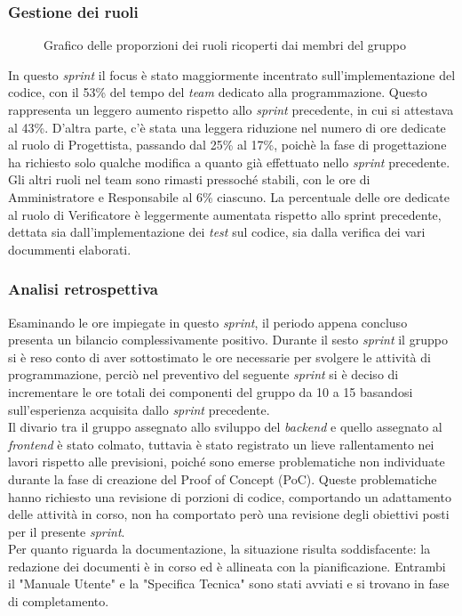 \subsubsection{Gestione dei ruoli}
\begin{figure}[h]
	\centering
	\caption{Grafico delle proporzioni dei ruoli ricoperti dai membri del gruppo}
\end{figure}

In questo \textit{sprint} il focus è stato maggiormente incentrato sull'implementazione del codice, con il 53\% del tempo del \textit{team} dedicato alla programmazione. Questo rappresenta un leggero aumento rispetto allo \textit{sprint} precedente, in cui si attestava al 43\%.
D'altra parte, c'è stata una leggera riduzione nel numero di ore dedicate al ruolo di Progettista, passando dal 25\% al 17\%, poichè la fase di progettazione ha richiesto solo qualche modifica a quanto già effettuato nello \textit{sprint} precedente.
Gli altri ruoli nel team sono rimasti pressoché stabili, con le ore di Amministratore e Responsabile al 6\% ciascuno. 
La percentuale delle ore dedicate al ruolo di Verificatore è leggermente aumentata rispetto allo sprint precedente, dettata sia dall'implementazione dei \textit{test} sul codice, sia dalla verifica dei vari docummenti elaborati.

\subsubsection{Analisi retrospettiva}
Esaminando le ore impiegate in questo \textit{sprint}, il periodo appena concluso presenta un bilancio complessivamente positivo. Durante il sesto \textit{sprint} il gruppo si è reso conto di aver sottostimato le ore necessarie per svolgere le attività di programmazione, perciò nel preventivo del seguente \textit{sprint} si è deciso di incrementare le ore totali dei componenti del gruppo da 10 a 15 basandosi sull'esperienza acquisita dallo \textit{sprint} precedente.\\
Il divario tra il gruppo assegnato allo sviluppo del \textit{backend} e quello assegnato al \textit{frontend} è stato colmato, tuttavia è stato registrato un lieve rallentamento nei lavori rispetto alle previsioni, poiché sono emerse problematiche non individuate durante la fase di creazione del Proof of Concept (PoC). Queste problematiche hanno richiesto una revisione di porzioni di codice, comportando un adattamento delle attività in corso, non ha comportato però una revisione degli obiettivi posti per il presente \textit{sprint}.\\
Per quanto riguarda la documentazione, la situazione risulta soddisfacente: la redazione dei documenti è in corso ed è allineata con la pianificazione. Entrambi il "Manuale Utente" e la "Specifica Tecnica" sono stati avviati e si trovano in fase di completamento.

